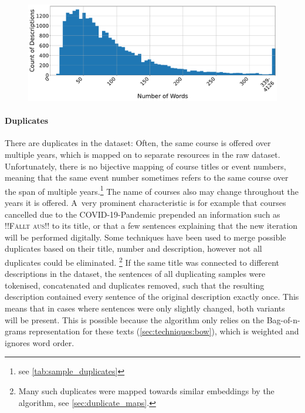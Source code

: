 \begin{figure}[h]
	\centering
	\includegraphics[width=\textwidth]{graphics/dataset_new/words_per_desc.pdf}
	\label{fig:sid_wordsperdesc}
\end{figure}

\paragraph{Duplicates}

There are duplicates in the dataset: Often, the same course is offered over multiple years, which is mapped on to separate resources in the raw dataset. Unfortunately, there is no bijective mapping of course titles or event numbers, meaning that the same event number sometimes refers to the same course over the span of multiple years.\footnote{see \autoref{tab:sample_duplicates}} The name of courses also may change throughout the years it is offered. A~very prominent characteristic is for example that courses cancelled due to the COVID-19-Pandemic prepended an information such as \textsc{!!Fällt aus!!} to its title, or that a few sentences explaining that the new iteration will be performed digitally. Some techniques have been used to merge possible duplicates based on their title, number and description, however not all duplicates could be eliminated. \footnote{Many such duplicates were mapped towards similar embeddings by the algorithm, see \autoref{sec:duplicate_maps}.} If the same title was connected to different descriptions in the dataset, the sentences of all duplicating samples were tokenised, concatenated and duplicates removed, such that the resulting description contained every sentence of the original description exactly once. This means that in cases where sentences were only slightly changed, both variants will be present. This is possible because the algorithm only relies on the Bag-of-n-grams representation for these texts (\autoref{sec:techniques:bow}), which is weighted and ignores word order.


